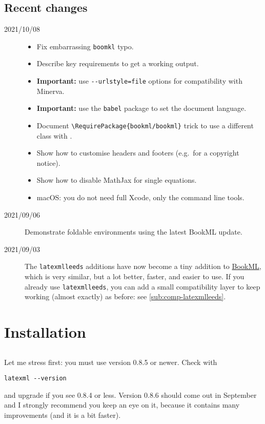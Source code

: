 \documentclass[a4paper]{article}
\def\ltxinline{\lstinline[style=latexml,frame=none]}
\theoremstyle{definition}
\begin{document}
\subsection*{Recent changes}
\begin{description}
  \item[2021/10/08]
    \begin{itemize}
      \item Fix embarrassing \ltxinline|boomkl| typo.
      \item Describe key requirements to get a working output.
      \item \textbf{Important:} use \ltxinline|--urlstyle=file| options for compatibility with Minerva.
      \item \textbf{Important:} use the \ltxinline|babel| package to set the document language.
      \item Document \ltxinline|\RequirePackage{bookml/bookml}| trick to use a different class with \LaTeXML{}.
      \item Show how to customise headers and footers (e.g.\ for a copyright notice).
      \item Show how to disable MathJax for single equations.
      \item macOS: you do not need full Xcode, only the command line tools.
    \end{itemize}
  \item[2021/09/06] Demonstrate foldable environments using the latest BookML update.
  \item[2021/09/03] The \texttt{latexmlleeds} additions have now become a tiny addition to \href{https://vlmantova.github.io/bookml/}{BookML}, which is very similar, but a lot better, faster, and easier to use. If you already use \texttt{latexmlleeds}, you can add a small compatibility layer to keep working (almost exactly) as before: see \autoref{sub:comp-latexmlleeds}.
  \end{description}

\tableofcontents

\section{Installation}

\subsection{\texorpdfstring{\LaTeXML{}}{LaTeXML}}
Let me stress first: you must use \LaTeXML{} version 0.8.5 or newer. Check with
\begin{lstlisting}
latexml --version
\end{lstlisting}
and upgrade if you see 0.8.4 or less. Version 0.8.6 should come out in September and I strongly recommend you keep an eye on it, because it contains many improvements (and it is a bit faster).
\end{document}
